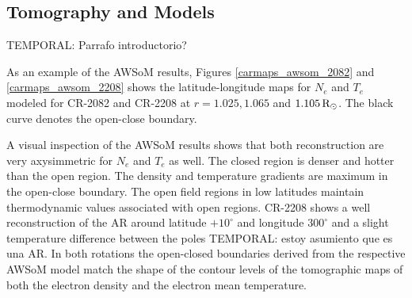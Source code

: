 \documentclass[namedreferences]{solarphysics}
\newcommand{\mdeg}{^\circ}
\newcommand{\mrsun}{{\rm R_\odot}}
\def\temp#1{\textcolor{mygray}{TEMPORAL: #1}}
\begin{document}
\begin{article}
\subsection{Tomography and Models}\label{awsom_res} 

\temp{Parrafo introductorio?}


As an example of the AWSoM results, Figures \ref{carmaps_awsom_2082} and \ref{carmaps_awsom_2208} shows the latitude-longitude maps for $N_e$ and $T_e$ modeled for CR-2082 and CR-2208 at $r=1.025, 1.065$ and $1.105\,\mrsun$. The black curve denotes the open-close boundary.



A visual inspection of the AWSoM results shows that both reconstruction are very axysimmetric for $N_e$ and $T_e$ as well. The closed region is denser and hotter than the open region. The density and temperature gradients are maximum in the open-close boundary. The open field regions in low latitudes maintain thermodynamic values associated with open regions. CR-2208 shows a well reconstruction of the AR around latitude $+10\mdeg$ and longitude $300\mdeg$ and a slight temperature difference between the poles \temp{estoy asumiento que es una AR}. 
In both rotations the open-closed boundaries derived from the respective AWSoM model match the shape of the contour levels of the tomographic maps of both the electron density and the electron mean temperature.



\end{article}
\end{document}
